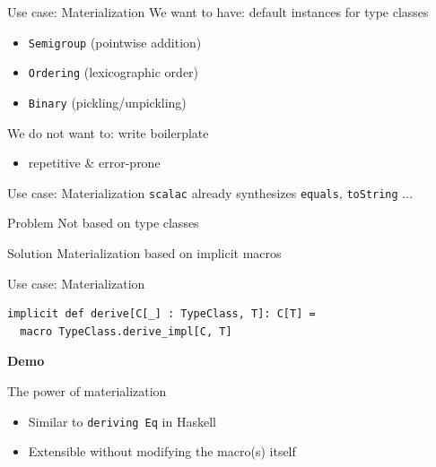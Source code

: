 \documentclass{beamer}
\newcommand\demoslide{
  {
    \setbeamertemplate{background}{}
    \begin{frame}[plain]
      \begin{center}\Large\bfseries Demo\end{center}
    \end{frame}
  }
}
\begin{document}
\begin{frame}{Use case: Materialization}
  We want to have: default instances for type classes
  \begin{itemize}
    \item \texttt{Semigroup} (pointwise addition)
    \item \texttt{Ordering} (lexicographic order)
    \item \texttt{Binary} (pickling/unpickling)
  \end{itemize}

  \vspace{1em}
  We do not want to: write boilerplate
  \begin{itemize}
    \item repetitive \& error-prone
  \end{itemize}
\end{frame}

\begin{frame}{Use case: Materialization}
  \texttt{scalac} already synthesizes \texttt{equals}, \texttt{toString} ...

  \vspace{1em}
  \begin{alertblock}{Problem}
    Not based on type classes
  \end{alertblock}

  \vspace{1em}
  \begin{exampleblock}{Solution}
    Materialization based on implicit macros
  \end{exampleblock}
\end{frame}

\begin{frame}[fragile]{Use case: Materialization}
  \begin{verbatim}
implicit def derive[C[_] : TypeClass, T]: C[T] =
  macro TypeClass.derive_impl[C, T]
  \end{verbatim}
\end{frame}

\demoslide

\begin{frame}{The power of materialization}
  \begin{itemize}
    \item Similar to \texttt{deriving Eq} in Haskell
    \item Extensible without modifying the macro(s) itself
  \end{itemize}
\end{frame}
\end{document}
